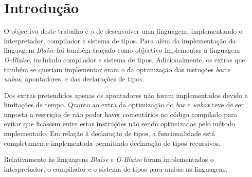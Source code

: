 \setlength{\parindent}{31pt}
\onehalfspacing
\chapter{Introdução}

O objectivo deste trabalho é o de desenvolver uma linguagem, implementando o interpretador, compilador e sistema de tipos.
Para além da implementação da linguagem \emph{Blaise} foi também traçado como objectivo implementar a linguagem \emph{O-Blaise}, incluíndo compilador e sistema de tipos. Adicionalmente, os extras que também se queriam implementar eram o da optimização das instuções \emph{box} e \emph{unbox}, apontadores, e das declarações de tipos.

Dos extras pretendidos apenas os apontadores não foram implementados devido a limitações de tempo. Quanto ao extra da optimização do \emph{box} e \emph{unbox} teve de ser imposta a restrição de não poder haver comentários no código compilado para evitar que ficassem entre estas instruções não sendo optimizadas pelo método implementado. Em relação à declaração de tipos, a funcionalidade está completamente implementada permitindo declaração de tipos recursivos.

Relativamente às linguagens \emph{Blaise} e \emph{O-Blaise} foram implementados o interpretador, o compilador e o sistema de tipos para ambas as linguagens.

